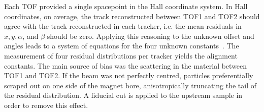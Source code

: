 Each TOF provided a single spacepoint in the Hall coordinate system.
In Hall coordinates, on average, the track reconstructed between
TOF1 and TOF2 should agree with the track reconstructed in each 
tracker, i.e. the mean residuals in $x, y, \alpha$, and $\beta$
should be zero. 
Applying this reasoning to the unknown offset and angles leads to a
system of equations for the four unknown
constants~\cite{2018arXiv1805.06623T}.
The measurement of four residual distributions per tracker yields the
alignment constants. 
The main source of bias was the scattering in the material between
TOF1 and TOF2.
If the beam was not perfectly centred, particles preferentially
scraped out on one side of the magnet bore, anisotropically truncating
the tail of the residual distribution. 
A fiducial cut is applied to the upstream sample in order to remove
this effect.

